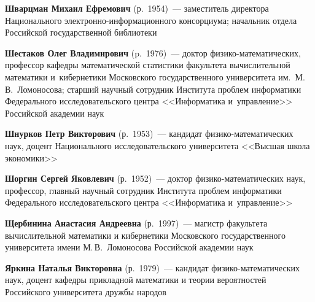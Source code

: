 \begin{multicols}{2}
 

 
 \noindent
\textbf{Шварцман Михаил Ефремович} (р.\ 1954)~--- 
заместитель директора Национального элект\-рон\-но-ин\-фор\-ма\-ци\-он\-но\-го 
консорциума; начальник отдела Российской государственной библиотеки


 
 \noindent
\textbf{Шестаков Олег Владимирович} (p.\ 1976)~--- доктор 
фи\-зи\-ко-ма\-те\-ма\-ти\-че\-ских, профессор кафедры математической 
статистики факультета вычислительной математики и~кибернетики Московского\linebreak 
\mbox{государственного} университета им.\ М.\,В.~Ломоносова; 
старший научный сотрудник Института
 \mbox{проб\-лем} информатики 
Федерального исследовательского центра <<Информатика и~управ\-ле\-ние>>
Российской академии наук


 \noindent
\textbf{Шнурков Петр Викторович} (р.\ 1953)~--- 
кандидат фи\-зи\-ко-ма\-те\-ма\-ти\-че\-ских наук, доцент 
Национального исследовательского университета <<Высшая школа экономики>>

 
\noindent
\textbf{Шоргин Сергей Яковлевич} (р.\ 1952)~--- 
доктор фи\-зи\-ко-ма\-те\-ма\-ти\-че\-ских наук, профессор, 
главный научный сотрудник Института проб\-лем информатики
Федерального исследовательского центра <<Информатика и~управ\-ле\-ние>>

 
 \noindent
\textbf{Щербинина Анастасия Андреевна} (р.\ 1997)~--- 
магистр факультета вычислительной математики и кибернетики 
Московского государственного университета имени М.\,В.~Ломоносова
 Российской академии \mbox{наук}

 
 \noindent
\textbf{Яркина Наталья Викторовна} (р.\ 1979)~--- 
кандидат фи\-зи\-ко-ма\-те\-ма\-ти\-че\-ских наук, доцент ка\-фед\-ры 
прикладной математики и теории вероятностей Российского 
университета дружбы народов
 
 



\def\leftkol{ОБ АВТОРАХ}

\def\rightkol{ОБ АВТОРАХ}


 \label{end\stat}



\end{multicols}

\def\leftkol{ОБ АВТОРАХ}
\def\rightkol{ОБ АВТОРАХ}

\newpage